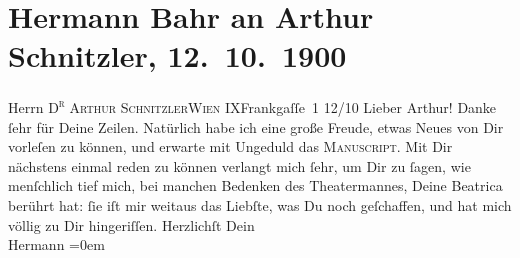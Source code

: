 

         \renewcommand{\erwaehnteOrte}{Orte: Frankgasse, IX., Alsergrund, Wien, XIII., Hietzing}
         \renewcommand{\erwaehnteWerke}{Werke: Der Schleier der Beatrice. Schauspiel in fünf Akten}
               \section[Hermann Bahr an Arthur Schnitzler, 12. 10. 1900]{ Hermann Bahr an Arthur Schnitzler, 12. 10. 1900}\nopagebreak{}\rehead{ }\begin{ledgroupsized}[t]{13cm}\normalsize\beginnumbering \toendnotes[C]{\smallbreak\pagebreak[2]} 
\pstart{}{\pb}Herrn \textsc{D\textsuperscript{r} Arthur Schnitzler}\pend{}\pstart{}\textsc{Wien IX}\pend{}\pstart{}Frankgaſſe 1\pend{}{\bigskip}\pstart
           \raggedleft{}{\pb}12/10\pend
           \pstart{}Lieber Arthur!\pend\pstart
           Danke ſehr für Deine Zeilen. Natürlich habe ich eine große Freude, etwas Neues von
               Dir vorleſen zu können, und erwarte mit Ungeduld das \textsc{Manuscript}. Mit Dir nächstens einmal reden zu können verlangt mich ſehr, um
               Dir zu ſagen, wie menſchlich tief mich, bei manchen Bedenken des Theatermannes, Deine
                  Beatrica berührt hat: ſie iſt mir weitaus das
               Liebſte, was \introOben{}Du\introOben{} noch geſchaffen, und hat mich völlig zu Dir
               hingeriſſen.\pend
           \pstart
           Herzlichſt Dein{\\[\baselineskip]}\spacefill\mbox{Hermann}\pend
           \leftskip=0em{}
         
         \endnumbering{}\end{ledgroupsized}  \newcommand{\dateiname}{L01077}\newcommand{\titel}{Hermann Bahr an Arthur Schnitzler, 12. 10. 1900}\newcommand{\editorInnen}{ Kurt Ifkovits,  Martin Anton Müller}
      